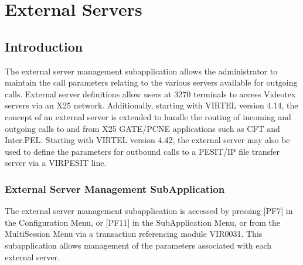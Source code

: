 \documentclass[letterpaper,10pt,english]{sphinxmanual}
\begin{document}
\ignorespaces 

\chapter{External Servers}
\label{\detokenize{connectivity_guide:external-servers}}\label{\detokenize{connectivity_guide:index-129}}

\section{Introduction}
\label{\detokenize{connectivity_guide:id66}}
\sphinxAtStartPar
The external server management sub\sphinxhyphen{}application allows the administrator to maintain the call parameters relating to the various servers available for outgoing calls. External server definitions allow users at 3270 terminals to access Videotex servers via an X25 network. Additionally, starting with VIRTEL version 4.14, the concept of an external server
is extended to handle the routing of incoming and outgoing calls to and from X25 GATE/PCNE applications such as CFT and Inter.PEL. Starting with VIRTEL version 4.42, the external server may also be used to define the parameters for outbound calls to a PESIT/IP file transfer server via a VIRPESIT line.

\ignorespaces 

\subsection{External Server Management Sub\sphinxhyphen{}Application}
\label{\detokenize{connectivity_guide:external-server-management-sub-application}}\label{\detokenize{connectivity_guide:index-130}}
\sphinxAtStartPar
The external server management sub\sphinxhyphen{}application is accessed by pressing {[}PF7{]} in the Configuration Menu, or {[}PF11{]} in the Sub\sphinxhyphen{}Application Menu, or from the Multi\sphinxhyphen{}Session Menu via a transaction referencing module VIR0031. This subapplication allows management of the parameters associated with each external server.

\ignorespaces 
\end{document}
